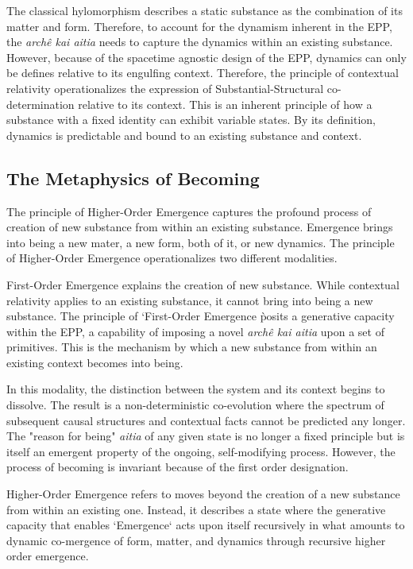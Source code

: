 The classical hylomorphism describes a static substance as the combination of its matter and form. Therefore, to account for the dynamism inherent in the EPP, the \textit{archê kai aitia} needs to capture the dynamics within an existing substance. However, because of the spacetime agnostic design of the EPP, dynamics can only be defines relative to its engulfing context. Therefore, the principle of contextual relativity operationalizes the expression of Substantial-Structural co-determination relative to its context. This is an inherent  principle of how a substance with a fixed identity can exhibit variable states. By its definition, dynamics is predictable and bound to an existing substance and context. 

\subsection{The Metaphysics of Becoming} 
\label{sec:metaphysics_becoming}


The principle of Higher-Order Emergence captures the profound process of creation of new substance from within an existing substance. Emergence brings into being a new mater, a new form, both of it, or new dynamics. The principle of Higher-Order Emergence operationalizes two different modalities.  

First-Order Emergence explains the creation of new substance. While contextual relativity applies to an existing substance, it cannot bring into being a new substance. The principle of `First-Order Emergence \` posits a generative capacity within the EPP, a capability of imposing a novel \textit{archê kai aitia} upon a set of primitives. This is the mechanism by which a new substance from within an existing context becomes into being.

In this modality, the distinction between the system and its context begins to dissolve. The result is a non-deterministic co-evolution where the spectrum of subsequent causal structures and contextual facts cannot be predicted any longer. The "reason for being" \textit{aitia} of any given state is no longer a fixed principle but is itself an emergent property of the ongoing, self-modifying process. However, the process of becoming is invariant because of the first order designation. 

Higher-Order Emergence refers to moves beyond the creation of a new substance from within an existing one. Instead, it describes a state where the generative capacity that enables `Emergence` acts upon itself recursively in what amounts to  dynamic co-mergence of form, matter, and dynamics through recursive higher order emergence. 

